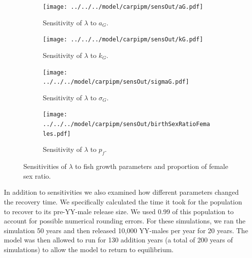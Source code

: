 \documentclass{article}[12pt]
\begin{document}
\begin{figure}[htbp]
	\centering
	\begin{subfigure}[b]{0.45\textwidth}
	   \texttt{[image: ../../../model/carpipm/sensOut/aG.pdf]} %
	   \caption{Sensitivity of \(\lambda\) to \(a_G\).}
	   \label{fig:sensET}
	\end{subfigure}
	\begin{subfigure}[b]{0.45\textwidth}
	   \texttt{[image: ../../../model/carpipm/sensOut/kG.pdf]} %
	   \caption{Sensitivity of \(\lambda\) to \(k_G\).}
	   \label{fig:sensEKG}
	\end{subfigure}
	\begin{subfigure}[b]{0.45\textwidth}
	   \texttt{[image: ../../../model/carpipm/sensOut/sigmaG.pdf]} %
	   \caption{Sensitivity of \(\lambda\) to \(\sigma_G\).}
	   \label{fig:sensEKG}
	\end{subfigure}
	\begin{subfigure}[b]{0.45\textwidth}
	   \texttt{[image: ../../../model/carpipm/sensOut/birthSexRatioFemales.pdf]} %
	   \caption{Sensitivity of \(\lambda\) to \(p_f\).}
	   \label{fig:sensPF}
	\end{subfigure}
     \caption{Sensitivities of \(\lambda\) to fish growth parameters and proportion of female sex ratio.}
   \label{fig:lengthSens}
\end{figure}



In addition to sensitivities we also examined how different parameters changed the recovery time. 
We specifically calculated the time it took for the population to recover to its pre-YY-male release size.
We used 0.99 of this population to account for possible numerical rounding errors.
For these simulations, we ran the simulation 50 years and then released 10,000 YY-males per year for 20 years. 
The model was then allowed to run for 130 addition years (a total of 200 years of simulations) to allow the model to return to equilibrium. 
\end{document}
